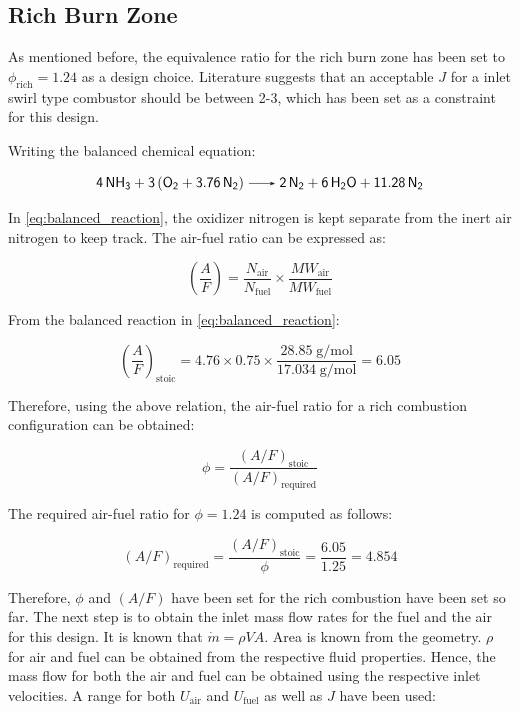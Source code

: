 \subsection{Rich Burn Zone}

As mentioned before, the equivalence ratio for the rich burn zone has been set to $\phi_{\text{rich}} = 1.24$ as a design choice.
Literature \cite{Talpallikar1992} suggests that an acceptable $J$ for a inlet swirl type combustor should be between 2-3, which has been set as a constraint for this design.


Writing the balanced chemical equation:


\begin{equation}
    \ce{4NH3 + 3(O2 + 3.76 N2) -> 2N2 + 6H2O + 11.28N2}\label{eq:balanced_reaction}
\end{equation}

In \autoref{eq:balanced_reaction}, the oxidizer nitrogen is kept separate from the inert air nitrogen to keep track. The air-fuel ratio can be expressed as:

\begin{equation}
    \left( \frac{A}{F} \right) = \frac{N_{\text{air}}}{N_{\text{fuel}}} \times \frac{MW_{\text{air}}}{MW_{\text{fuel}}}
\end{equation}

From the balanced reaction in \autoref{eq:balanced_reaction}:

\begin{equation}
    \left( \frac{A}{F} \right)_{\text{stoic}} = 4.76 \times 0.75 \times \frac{28.85 \; \text{g/mol}}{17.034 \; \text{g/mol}} = 6.05
\end{equation}


Therefore, using the above relation, the air-fuel ratio for a rich combustion configuration can be obtained:

\begin{equation}
    \phi = \frac{(A/F)_{\text{stoic}}}{(A/F)_{\text{required}}}
\end{equation}

The required air-fuel ratio for $\phi = 1.24$ is computed as follows:

\begin{equation}
    (A/F)_{\text{required}} = \frac{(A/F)_{\text{stoic}}}{\phi} = \frac{6.05}{1.25} = 4.854
\end{equation}

Therefore, $\phi$ and $(A/F)$ have been set for the rich combustion have been set so far. The next step is to obtain the inlet mass flow rates for the 
fuel and the air for this design. It is known that $\dot{m} = \rho V A$. Area is known from the geometry. $\rho$ for air and fuel can be obtained from the respective fluid properties. Hence,
the mass flow for both the air and fuel can be obtained using the respective inlet velocities. A range for both $U_{\text{air}}$ and $U_{\text{fuel}}$ as well as $J$ have been used:

